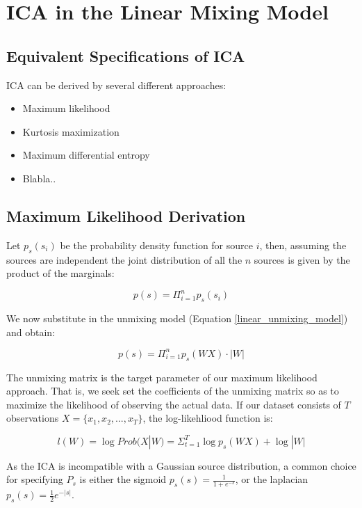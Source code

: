 \documentclass[11pt, oneside, a4paper]{report}
\begin{document}
\section{ICA in the Linear Mixing Model}

\subsection{Equivalent Specifications of ICA}

ICA can be derived by several different approaches:
\begin{itemize}
  \item Maximum likelihood
  \item Kurtosis maximization
  \item Maximum differential entropy
  \item Blabla..
\end{itemize}



\subsection{Maximum Likelihood Derivation}\label{ml_ica}

Let $p_s(s_i)$ be the probability density function for source $i$, then, assuming the sources are independent the joint distribution of all the $n$ sources is given by the product of the marginals:

\begin{equation}
  p(s) = \Pi_{i=1}^n p_s(s_i)
\end{equation}

We now substitute in the unmixing model (Equation \ref{linear_unmixing_model}) and obtain:

\begin{equation}
  p(s) = \Pi_{i=1}^n p_s(WX) \cdot |W|
\end{equation}

The unmixing matrix is the target parameter of our maximum likelihood approach. That is, we seek set the coefficients of the unmixing matrix so as to maximize the likelihood of observing the actual data. If our dataset consists of $T$ observations $X = \{x_1,x_2,...,x_T\}$, the log-likehliood function is:

\begin{equation}
  l(W) =\log Prob(X|W)= \Sigma_{t=1}^T \log p_s(WX)+\log |W|
\end{equation}

As the ICA is incompatible with a Gaussian source distribution, a common choice for specifying $P_s$ is either the sigmoid $p_s(s) = \frac{1}{1+e^{-s}}$, or the laplacian $p_s(s) = \frac{1}{2}e^{-|s|}$.
\end{document}
